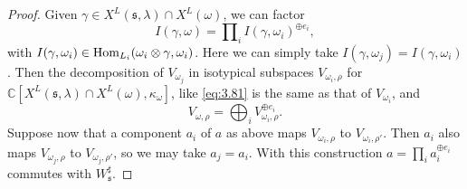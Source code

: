 \documentclass[11pt]{amsart}
\theoremstyle{definition}
\begin{document}
\begin{proof}
Given $\gamma \in X^L ({{\mathfrak s}},\lambda) \cap X^L (\omega)$, we can factor 
\[
I (\gamma,\omega) = \prod\nolimits_i I(\gamma,\omega_i)^{\oplus e_i} ,
\]
with $I(\gamma,\omega_i) \in {{\rm Hom}}_{L_i}(\omega_i \otimes \gamma,\omega_i)$.
Here we can simply take $I(\gamma,\omega_j) = I(\gamma, \omega_i)$. Then the 
decomposition of $V_{\omega_j}$ in isotypical subspaces $V_{\omega_i,\rho}$ for 
${\mathbb C}[X^L ({{\mathfrak s}},\lambda) \cap X^L (\omega),\kappa_\omega]$, like \eqref{eq:3.81} is 
the same as that of $V_{\omega_i}$, and 
\[
V_{\omega,\rho} = \bigoplus\nolimits_i V_{\omega_i,\rho}^{\oplus e_i} .
\]
Suppose now that a component $a_i$ of $a$ as above
maps $V_{\omega_i,\rho}$ to $V_{\omega_i,\rho'}$. Then $a_i$ also maps 
$V_{\omega_j,\rho}$ to $V_{\omega_j,\rho'}$, so we may take $a_j = a_i$. With
this construction $a = \prod_i a_i^{\oplus e_i}$ commutes with $W_{{\mathfrak s}}^\sharp$.


\end{proof}
\end{document}
